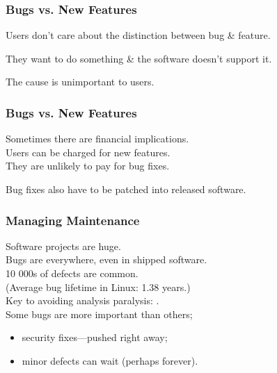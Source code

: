 \begin{frame}
\frametitle{Bugs vs. New Features}
\begin{changemargin}{1cm}

Users don't care about the distinction between bug \& feature.

They want to do something \& the software doesn't support it.

The cause is unimportant to users.

\end{changemargin}
\end{frame}

\begin{frame}
\frametitle{Bugs vs. New Features}
\begin{changemargin}{1cm}

Sometimes there are financial implications.\\
	\quad Users can be charged for new features.\\
	\quad They are unlikely to pay for bug fixes.
	

Bug fixes also have to be patched into released software.

\end{changemargin}
\end{frame}

\begin{frame}
\frametitle{Managing Maintenance}
\begin{changemargin}{1cm}

Software projects are huge.\\[1em]

Bugs are everywhere, even in shipped software.\\[1em]

10 000s of defects are common. \\
\qquad (Average bug lifetime in Linux: 1.38 years.)\\[2em]

Key to avoiding analysis paralysis: .\\[1em]

Some bugs are more important than others;
\begin{itemize}
\item security fixes---pushed right away;
\item minor defects can wait (perhaps forever).
\end{itemize}

\end{changemargin}
\end{frame}

